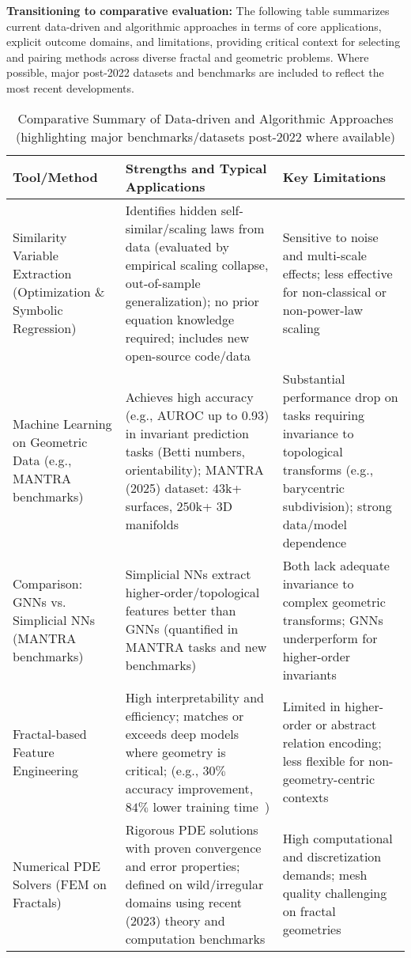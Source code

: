 \documentclass[sigconf]{acmart}
\begin{document}
\textbf{Transitioning to comparative evaluation:} The following table summarizes current data-driven and algorithmic approaches in terms of core applications, explicit outcome domains, and limitations, providing critical context for selecting and pairing methods across diverse fractal and geometric problems. Where possible, major post-2022 datasets and benchmarks are included to reflect the most recent developments.

\begin{table*}[htbp]
\centering
\caption{Comparative Summary of Data-driven and Algorithmic Approaches (highlighting major benchmarks/datasets post-2022 where available)}
\label{tab:data_driven_methods}
\begin{adjustbox}{max width=\textwidth}
\begin{tabular}{lll}
\toprule
\textbf{Tool/Method} & \textbf{Strengths and Typical Applications} & \textbf{Key Limitations} \\
\midrule
Similarity Variable Extraction (Optimization \& Symbolic Regression)~\cite{ref65} & Identifies hidden self-similar/scaling laws from data (evaluated by empirical scaling collapse, out-of-sample generalization); no prior equation knowledge required; includes new open-source code/data & Sensitive to noise and multi-scale effects; less effective for non-classical or non-power-law scaling \\
Machine Learning on Geometric Data (e.g., MANTRA benchmarks)~\cite{ref26} & Achieves high accuracy (e.g., AUROC up to 0.93) in invariant prediction tasks (Betti numbers, orientability); MANTRA (2025) dataset: $43$k+ surfaces, $250$k+ 3D manifolds & Substantial performance drop on tasks requiring invariance to topological transforms (e.g., barycentric subdivision); strong data/model dependence \\
Comparison: GNNs vs. Simplicial NNs (MANTRA benchmarks)~\cite{ref26} & Simplicial NNs extract higher-order/topological features better than GNNs (quantified in MANTRA tasks and new benchmarks) & Both lack adequate invariance to complex geometric transforms; GNNs underperform for higher-order invariants \\
Fractal-based Feature Engineering~\cite{ref39,ref30} & High interpretability and efficiency; matches or exceeds deep models where geometry is critical; (e.g., $30\%$ accuracy improvement, $84\%$ lower training time~\cite{ref39}) & Limited in higher-order or abstract relation encoding; less flexible for non-geometry-centric contexts \\
Numerical PDE Solvers (FEM on Fractals)~\cite{ref29,ref33} & Rigorous PDE solutions with proven convergence and error properties; defined on wild/irregular domains using recent (2023) theory and computation benchmarks & High computational and discretization demands; mesh quality challenging on fractal geometries \\

\end{tabular}
\end{adjustbox}
\end{table*}
\end{document}
